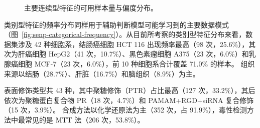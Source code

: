 \documentclass[letterpaper]{article}
\begin{document}
\begin{figure}[H]
  \begin{minipage}{0.62\linewidth}
    \centering
  \end{minipage}
  \caption{主要连续型特征的可用样本量与偏度分布。}
  \label{fig:senp-continuous-summary}
\end{figure}

类别型特征的频率分布同样用于辅助判断模型可能学习到的主要数据模式（图~\ref{fig:senp-categorical-frequency}）。从目前所考察的类别型特征分布来看，数据集涉及 42 种细胞系，结肠癌细胞 HCT 116 出现频率最高（98 次，25.6\%），其次为肝癌细胞 HepG2（41 次，10.7\%）、黑色素瘤细胞 A375（23 次，6.0\%）和乳腺癌细胞 MCF-7（23 次，6.0\%），前 10 种细胞系合计覆盖 71.0\% 的样本。
组织来源以结肠（28.7\%）、肝脏（16.7\%）和脑组织（8.9\%）为主。

表面修饰类型共 43 种，其中聚糖修饰（PTR）占比最高（127 次，33.2\%），其后依次为聚糖蛋白复合物 PR（18 次，4.7\%）和 PAMAM+RGD+siRNA 复合修饰（15 次，3.9\%）。
合成方法以化学还原法为主（352 次，占 91.9\%），毒性检测方法中最常见的是 MTT 法（206 次，53.8\%）。
\end{document}
